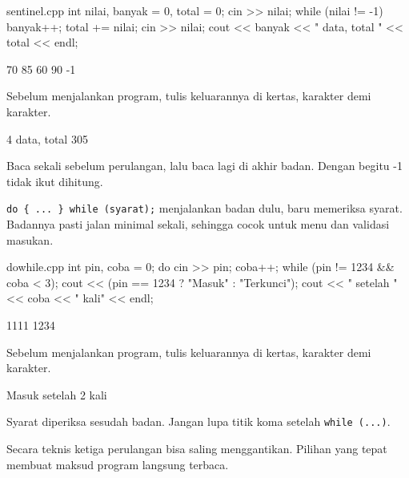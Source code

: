 \documentclass[a4paper]{article}
\begin{document}
\begin{MKode}{sentinel.cpp}
int nilai, banyak = 0, total = 0;
cin >> nilai;
while (nilai != -1) {
    banyak++;
    total += nilai;
    cin >> nilai;
}
cout << banyak << " data, total " << total << endl;
\end{MKode}
\begin{MKeluaran}[title={Masukan}]
70 85 60 90 -1
\end{MKeluaran}
\begin{Tebak}[]
Sebelum menjalankan program, tulis keluarannya di kertas, karakter demi karakter.
\end{Tebak}
\begin{Jawaban}[]
\begin{MKeluaran}[]
4 data, total 305
\end{MKeluaran}
Baca sekali sebelum perulangan, lalu baca lagi di akhir badan. Dengan begitu -1 tidak ikut dihitung.
\end{Jawaban}
\texttt{do \{ ... \} while (syarat);} menjalankan badan dulu, baru memeriksa syarat. Badannya pasti jalan minimal sekali, sehingga cocok untuk menu dan validasi masukan.

\begin{MKode}{dowhile.cpp}
int pin, coba = 0;
do {
    cin >> pin;
    coba++;
} while (pin != 1234 && coba < 3);
cout << (pin == 1234 ? "Masuk" : "Terkunci");
cout << " setelah " << coba << " kali" << endl;
\end{MKode}
\begin{MKeluaran}[title={Masukan}]
1111 1234
\end{MKeluaran}
\begin{Tebak}[]
Sebelum menjalankan program, tulis keluarannya di kertas, karakter demi karakter.
\end{Tebak}
\begin{Jawaban}[]
\begin{MKeluaran}[]
Masuk setelah 2 kali
\end{MKeluaran}
Syarat diperiksa sesudah badan. Jangan lupa titik koma setelah \texttt{while (...)}.
\end{Jawaban}
Secara teknis ketiga perulangan bisa saling menggantikan. Pilihan yang tepat membuat maksud program langsung terbaca.
\end{document}
